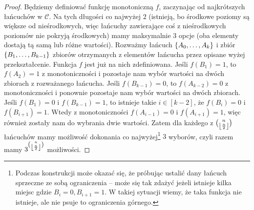 \begin{proof}
	Będziemy definiować funkcję monotoniczną \(f\), zaczynając od najkrótszych
	łańcuchów w \(\mathcal C\). Na tych długości co najwyżej \(2\) (istnieją, bo
	środkowe poziomy są większe od nieśrodkowych, więc łańcuchy zawierające coś z
	nieśrodkowych poziomów nie pokryją środkowych) mamy maksymalnie \(3\) opcje
	(oba elementy dostają tą samą lub różne wartości). Rozważmy łańcuch
	\(\set{A_0,\ldots, A_k}\) i zbiór \(\set{B_1,\ldots,B_{k-1}}\) zbiorów
	otrzymanych z elementów łańcucha przez opisane wyżej przekształcenie. Funkcja
	\(f\) jest już na nich zdefiniowana. Jeśli \(f(B_1)=1\), to \(f(A_2)=1\) z
	monotoniczności i pozostaje nam wybór wartości na dwóch zbiorach z
	rozważanego łańcucha. Jeśli \(f(B_{k-1})=0\), to \(f(A_{k-2})=0\) z
	monotoniczności i ponownie pozostaje nam wybór wartości na dwóch zbiorach.
	Jeśli \(f(B_1)=0\) i \(f(B_{k-1})=1\), to istnieje takie \(i\in [k-2]\), że
	\(f(B_i)=0\) i \(f(B_{i+1})=1\). Wtedy z monotoniczności \(f(A_{i-1})=0\) i
	\(f(A_{i+1})=1\), więc również zostały nam do wybrania dwie wartości. Zatem dla
	każdego z \(\binom{n}{\left\lfloor\frac n2\right\rfloor}\) łańcuchów mamy możliwość dokonania co
	najwyżej\footnote{Podczas konstrukcji może okazać się, że próbując ustalić dany łańcuch
		sprzeczne ze sobą ograniczenia -- może się tak zdażyć jeżeli istnieje kilka miejsc gdzie \(B_i = 0, B_{i+1} = 1\).
		W takiej sytuacji wiemy, że taka funkcja nie istnieje, ale nie psuje to ograniczenia górnego.} \(3\) wyborów, czyli razem mamy \(3^{\binom{n}{\left\lfloor\frac n2\right\rfloor}}\) możliwości.
\end{proof}

